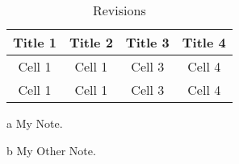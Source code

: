 \documentclass[10pt, a4paper]{article}
\begin{document}
\begin{table}[ht]
  \centering
  \caption{Revisions}
   \begin{threeparttable}
  \centering
      \begin{tabular}{cccc}
      \toprule
          Title 1 & Title 2 & Title 3 & Title 4          \\
      \midrule
          Cell 1  & Cell 1  & Cell 3  & Cell 4 \tnote{a} \\
          Cell 1  & Cell 1  & Cell 3  & Cell 4 \tnote{b} \\
      \bottomrule
      \end{tabular}
      \begin{tablenotes}
          \item[a] My Note.
          \item[b] My Other Note.
      \end{tablenotes}
   \end{threeparttable}
\end{table}
\end{document}
